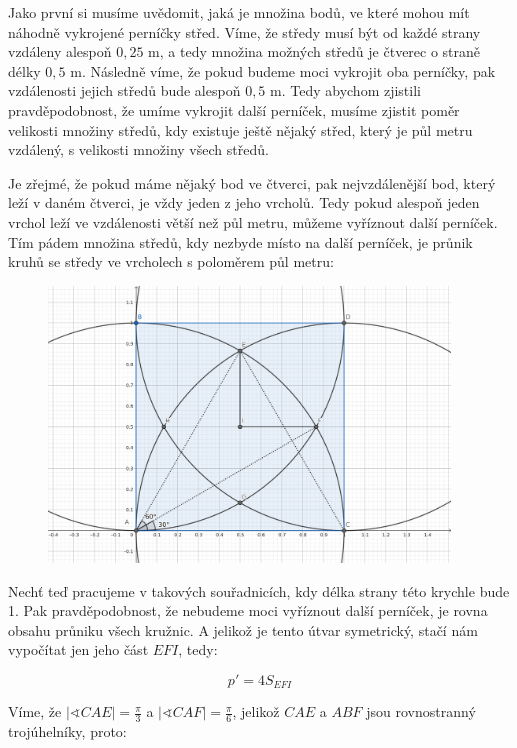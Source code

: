 \documentclass{fkssolpub}
\author{Ondřej Sedláček}
\renewcommand{\angle}{\sphericalangle}
\begin{document}
Jako první si musíme uvědomit, jaká je množina bodů, ve které mohou mít náhodně vykrojené perníčky střed. Víme, že středy musí být od každé strany vzdáleny alespoň $0{,}25$ m, a tedy množina možných středů je čtverec o straně délky $0{,}5$ m. Následně víme, že pokud budeme moci vykrojit oba perníčky, pak vzdálenosti jejich středů bude alespoň $0{,}5$ m. Tedy abychom zjistili pravděpodobnost, že umíme vykrojit další perníček, musíme zjistit poměr velikosti množiny středů, kdy existuje ještě nějaký střed, který je půl metru vzdálený, s velikosti množiny všech středů.

Je zřejmé, že pokud máme nějaký bod ve čtverci, pak nejvzdálenější bod, který leží v daném čtverci, je vždy jeden z jeho vrcholů. Tedy pokud alespoň jeden vrchol leží ve vzdálenosti větší než půl metru, můžeme vyříznout další perníček. Tím pádem množina středů, kdy nezbyde místo na další perníček, je průnik kruhů se středy ve vrcholech s poloměrem půl metru: 
\begin{figure}[h!]
  \begin{center}
    \includegraphics[width=0.95\textwidth]{C-fig.png}
  \end{center}
  \caption{}\label{fig:1}
\end{figure}

Nechť teď pracujeme v takových souřadnicích, kdy délka strany této krychle bude 1. Pak pravděpodobnost, že nebudeme moci vyříznout další perníček, je rovna obsahu průniku všech kružnic. A jelikož je tento útvar symetrický, stačí nám vypočítat jen jeho část $EFI$, tedy:

\[
p' = 4 S_{EFI}
\]

Víme, že $|\angle CAE| = \frac{\pi}{3}$ a $|\angle CAF| = \frac{\pi}{6}$, jelikož $CAE$ a $ABF$ jsou rovnostranný trojúhelníky, proto:
\end{document}
